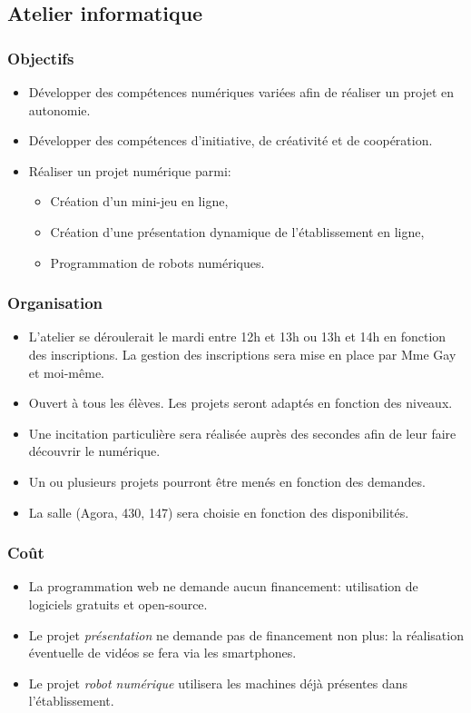 \documentclass[a4paper,11pt]{article}
\begin{document}
\begin{Form}
\part*{Atelier informatique}
\section{Objectifs}
\begin{itemize}
\item Développer des compétences numériques variées afin de réaliser un projet en autonomie.
\item Développer des compétences d'initiative, de créativité et de coopération.
\item Réaliser un projet numérique parmi:
\begin{itemize}
\item Création d'un mini-jeu en ligne,
\item Création d'une présentation dynamique de l'établissement en ligne,
\item Programmation de robots numériques.
\end{itemize}
\end{itemize}
\section{Organisation}
\begin{itemize}
\item L'atelier se déroulerait le mardi entre 12h et 13h ou 13h et 14h en fonction des inscriptions. La gestion des inscriptions sera mise en place par Mme Gay et moi-même.
\item Ouvert à tous les élèves. Les projets seront adaptés en fonction des niveaux. 
\item Une incitation particulière sera réalisée auprès des secondes afin de leur faire découvrir le numérique.
\item Un ou plusieurs projets pourront être menés en fonction des demandes.
\item La salle (Agora, 430, 147) sera choisie en fonction des disponibilités.
\end{itemize}
\section{Coût}
\begin{itemize}
\item La programmation web ne demande aucun financement: utilisation de logiciels gratuits et open-source.
\item Le projet \emph{présentation} ne demande pas de financement non plus: la réalisation éventuelle de vidéos se fera via les smartphones.
\item Le projet \emph{robot numérique} utilisera les machines déjà présentes dans l'établissement.
\end{itemize}
\end{Form}
\end{document}
